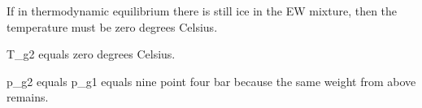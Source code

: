 If in thermodynamic equilibrium there is still ice in the EW mixture, then the temperature must be zero degrees Celsius.  

T_g2 equals zero degrees Celsius.  

p_g2 equals p_g1 equals nine point four bar because the same weight from above remains.
